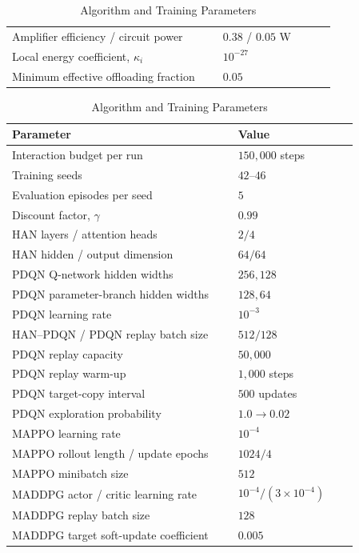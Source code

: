 \documentclass[journal]{IEEEtran}
\makeatletter
\newcommand{\LEOTableSetup}{%
  \setlength{\parskip}{0pt}%
  \setlength{\belowcaptionskip}{5pt}%
  \def\@IEEEtablecaptionsepspace{\vskip5pt\relax}%
}
\makeatother
\begin{document}
\begin{table}[t]
\begin{minipage}[t]{0.485\textwidth}
\begin{tabular}{p{0.60\linewidth}p{0.32\linewidth}}
        Amplifier efficiency / circuit power & $0.38$ / $0.05$ W \\
        Local energy coefficient, $\kappa_i$ & $10^{-27}$ \\
        Minimum effective offloading fraction & $0.05$ \\
        \hline
    \end{tabular}
\end{minipage}\hfill%
\begin{minipage}[t]{0.485\textwidth}
\vspace{0pt}
\LEOTableSetup
\caption{Algorithm and Training Parameters}
    \label{tab:training_parameters}
    \centering
    \footnotesize
    \renewcommand{\arraystretch}{1.08}
    \setlength{\tabcolsep}{4pt}
    \begin{tabular}{p{0.60\linewidth}p{0.32\linewidth}}
        \hline
        Parameter & Value \\
        \hline
        Interaction budget per run & $150{,}000$ steps \\
        Training seeds & $42$--$46$ \\
        Evaluation episodes per seed & $5$ \\
        Discount factor, $\gamma$ & $0.99$ \\
        HAN layers / attention heads & $2/4$ \\
        HAN hidden / output dimension & $64/64$ \\
        PDQN Q-network hidden widths & $256,128$ \\
        PDQN parameter-branch hidden widths & $128,64$ \\
        PDQN learning rate & $10^{-3}$ \\
        HAN--PDQN / PDQN replay batch size & $512/128$ \\
        PDQN replay capacity & $50{,}000$ \\
        PDQN replay warm-up & $1{,}000$ steps \\
        PDQN target-copy interval & $500$ updates \\
        PDQN exploration probability & $1.0\rightarrow0.02$ \\
        MAPPO learning rate & $10^{-4}$ \\
        MAPPO rollout length / update epochs & $1024/4$ \\
        MAPPO minibatch size & $512$ \\
        MADDPG actor / critic learning rate
        & $10^{-4}/(3\times10^{-4})$ \\
        MADDPG replay batch size & $128$ \\
        MADDPG target soft-update coefficient & $0.005$ \\
        \hline
    \end{tabular}
\end{minipage}
\end{table}
\end{document}
